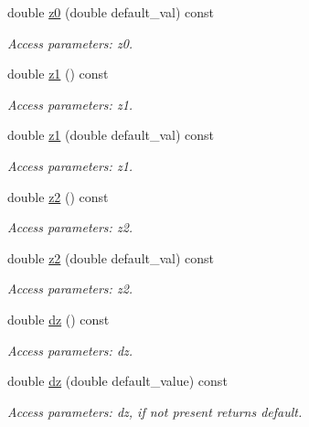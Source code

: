 \begin{DoxyCompactItemize}
double \hyperlink{struct_d_d4hep_1_1_x_m_l_1_1_dimension_a2839cdcdcb0d64a06bf6ab5288a38c35}{z0} (double default\_\-val) const 
\begin{DoxyCompactList}\small\item\em Access parameters: z0. \item\end{DoxyCompactList}\item 
double \hyperlink{struct_d_d4hep_1_1_x_m_l_1_1_dimension_a608b53b98761283698390327912a8528}{z1} () const 
\begin{DoxyCompactList}\small\item\em Access parameters: z1. \item\end{DoxyCompactList}\item 
double \hyperlink{struct_d_d4hep_1_1_x_m_l_1_1_dimension_a61e075101982a424d46b943485cc787b}{z1} (double default\_\-val) const 
\begin{DoxyCompactList}\small\item\em Access parameters: z1. \item\end{DoxyCompactList}\item 
double \hyperlink{struct_d_d4hep_1_1_x_m_l_1_1_dimension_a0c4e9d9d1631b541e029155e18cb5e35}{z2} () const 
\begin{DoxyCompactList}\small\item\em Access parameters: z2. \item\end{DoxyCompactList}\item 
double \hyperlink{struct_d_d4hep_1_1_x_m_l_1_1_dimension_a23686896013597d53d2b21faba9e9b76}{z2} (double default\_\-val) const 
\begin{DoxyCompactList}\small\item\em Access parameters: z2. \item\end{DoxyCompactList}\item 
double \hyperlink{struct_d_d4hep_1_1_x_m_l_1_1_dimension_a431685c20775c15f137242d1d2dabd60}{dz} () const 
\begin{DoxyCompactList}\small\item\em Access parameters: dz. \item\end{DoxyCompactList}\item 
double \hyperlink{struct_d_d4hep_1_1_x_m_l_1_1_dimension_a55ace977e6d3c4daa023833fd7db5454}{dz} (double default\_\-value) const 
\begin{DoxyCompactList}\small\item\em Access parameters: dz, if not present returns default. \item\end{DoxyCompactList}\item 

\end{DoxyCompactItemize}

